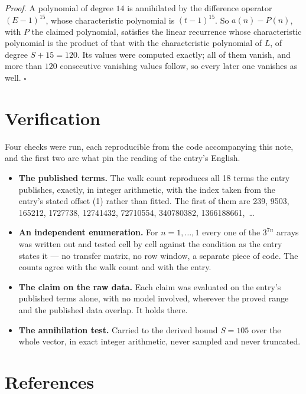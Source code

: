 \documentclass[11pt]{article}
\theoremstyle{definition}
\begin{document}
{\itshape Proof.} A polynomial of degree $14$ is annihilated by the difference operator $(E-1)^{15}$, whose characteristic polynomial is $(t-1)^{15}$. So $a(n) - P(n)$, with $P$ the claimed polynomial, satisfies the linear recurrence whose characteristic polynomial is the product of that with the characteristic polynomial of $L$, of degree $S + 15 = 120$. Its values were computed exactly; all of them vanish, and more than $120$ consecutive vanishing values follow, so every later one vanishes as well. $\square$

\section{Verification}

Four checks were run, each reproducible from the code accompanying this note, and the first two are what pin the reading of the entry's English.

\begin{itemize}

\item {\bfseries The published terms.} The walk count reproduces all 18 terms the entry publishes, exactly, in integer arithmetic, with the index taken from the entry's stated offset (1) rather than fitted. The first of them are 239, 9503, 165212, 1727738, 12741432, 72710554, 340780382, 1366188661,~\dots

\item {\bfseries An independent enumeration.} For $n = 1,\dots,1$ every one of the $3^{7n}$ arrays was written out and tested cell by cell against the condition as the entry states it --- no transfer matrix, no row window, a separate piece of code. The counts agree with the walk count and with the entry.

\item {\bfseries The claim on the raw data.} Each claim was evaluated on the entry's published terms alone, with no model involved, wherever the proved range and the published data overlap. It holds there.

\item {\bfseries The annihilation test.} Carried to the derived bound $S = 105$ over the whole vector, in exact integer arithmetic, never sampled and never truncated.

\end{itemize}

\section{References}
\end{document}
